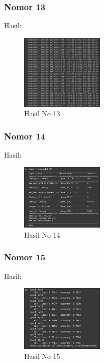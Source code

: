 \begin{enumerate}
\subsubsection{Nomor 13}
\hfill\break

Hasil:
\begin{figure}[H]
\centering
	\includegraphics[width=4cm]{figures/1174075/7/no13.jpg}
	\caption{Hasil No 13}
\end{figure}

\subsubsection{Nomor 14}
\hfill\break

Hasil:
\begin{figure}[H]
\centering
	\includegraphics[width=4cm]{figures/1174075/7/no14.jpg}
	\caption{Hasil No 14}
\end{figure}

\subsubsection{Nomor 15}
\hfill\break

Hasil:
\begin{figure}[H]
\centering
	\includegraphics[width=4cm]{figures/1174075/7/no15.jpg}
	\caption{Hasil No 15}
\end{figure}


\end{enumerate}
